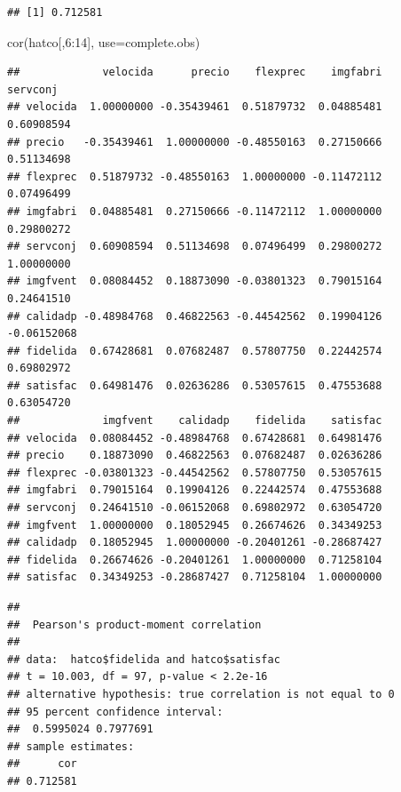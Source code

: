 \documentclass[
]{book}
\newenvironment{Shaded}{\begin{snugshade}}{\end{snugshade}}
\newcommand{\AttributeTok}[1]{\textcolor[rgb]{0.77,0.63,0.00}{#1}}
\newcommand{\DecValTok}[1]{\textcolor[rgb]{0.00,0.00,0.81}{#1}}
\newcommand{\FunctionTok}[1]{\textcolor[rgb]{0.00,0.00,0.00}{#1}}
\newcommand{\NormalTok}[1]{#1}
\newcommand{\SpecialCharTok}[1]{\textcolor[rgb]{0.00,0.00,0.00}{#1}}
\newcommand{\StringTok}[1]{\textcolor[rgb]{0.31,0.60,0.02}{#1}}
\theoremstyle{break}
\begin{document}
\begin{verbatim}
## [1] 0.712581
\end{verbatim}

\begin{Shaded}
\begin{Highlighting}[]
\FunctionTok{cor}\NormalTok{(hatco[,}\DecValTok{6}\SpecialCharTok{:}\DecValTok{14}\NormalTok{], }\AttributeTok{use=}\StringTok{\textquotesingle{}complete.obs\textquotesingle{}}\NormalTok{)}
\end{Highlighting}
\end{Shaded}

\begin{verbatim}
##             velocida      precio    flexprec    imgfabri    servconj
## velocida  1.00000000 -0.35439461  0.51879732  0.04885481  0.60908594
## precio   -0.35439461  1.00000000 -0.48550163  0.27150666  0.51134698
## flexprec  0.51879732 -0.48550163  1.00000000 -0.11472112  0.07496499
## imgfabri  0.04885481  0.27150666 -0.11472112  1.00000000  0.29800272
## servconj  0.60908594  0.51134698  0.07496499  0.29800272  1.00000000
## imgfvent  0.08084452  0.18873090 -0.03801323  0.79015164  0.24641510
## calidadp -0.48984768  0.46822563 -0.44542562  0.19904126 -0.06152068
## fidelida  0.67428681  0.07682487  0.57807750  0.22442574  0.69802972
## satisfac  0.64981476  0.02636286  0.53057615  0.47553688  0.63054720
##             imgfvent    calidadp    fidelida    satisfac
## velocida  0.08084452 -0.48984768  0.67428681  0.64981476
## precio    0.18873090  0.46822563  0.07682487  0.02636286
## flexprec -0.03801323 -0.44542562  0.57807750  0.53057615
## imgfabri  0.79015164  0.19904126  0.22442574  0.47553688
## servconj  0.24641510 -0.06152068  0.69802972  0.63054720
## imgfvent  1.00000000  0.18052945  0.26674626  0.34349253
## calidadp  0.18052945  1.00000000 -0.20401261 -0.28687427
## fidelida  0.26674626 -0.20401261  1.00000000  0.71258104
## satisfac  0.34349253 -0.28687427  0.71258104  1.00000000
\end{verbatim}

\begin{Shaded}
\end{Shaded}

\begin{verbatim}
## 
##  Pearson's product-moment correlation
## 
## data:  hatco$fidelida and hatco$satisfac
## t = 10.003, df = 97, p-value < 2.2e-16
## alternative hypothesis: true correlation is not equal to 0
## 95 percent confidence interval:
##  0.5995024 0.7977691
## sample estimates:
##      cor 
## 0.712581
\end{verbatim}
\end{document}

